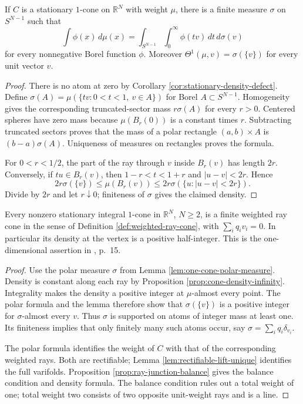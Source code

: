 \begin{lemma}\label{lem:one-cone-polar-measure}
If $C$ is a stationary $1$-cone on $\mathbb R^N$ with weight $\mu$, there is a finite measure $\sigma$ on $S^{N-1}$ such that
\[
 \int\phi(x)\,d\mu(x)=\int_{S^{N-1}}\int_0^\infty\phi(tv)\,dt\,d\sigma(v)
\]
for every nonnegative Borel function $\phi$. Moreover $\Theta^1(\mu,v)=\sigma(\{v\})$ for every unit vector $v$.
\end{lemma}
\begin{proof}
There is no atom at zero by Corollary \ref{cor:stationary-density-defect}. Define $\sigma(A)=\mu(\{tv:0<t<1,\ v\in A\})$ for Borel $A\subset S^{N-1}$. Homogeneity gives the corresponding truncated-sector mass $r\sigma(A)$ for every $r>0$. Centered spheres have zero mass because $\mu(B_r(0))$ is a constant times $r$. Subtracting truncated sectors proves that the mass of a polar rectangle $(a,b)\times A$ is $(b-a)\sigma(A)$. Uniqueness of measures on rectangles proves the formula.

For $0<r<1/2$, the part of the ray through $v$ inside $B_r(v)$ has length $2r$. Conversely, if $tu\in B_r(v)$, then $1-r<t<1+r$ and $|u-v|<2r$. Hence
\[
 2r\sigma(\{v\})\leq\mu(B_r(v))
 \leq2r\sigma(\{u:|u-v|<2r\}).
\]
Divide by $2r$ and let $r\downarrow0$; finiteness of $\sigma$ gives the claimed density.
\end{proof}

\begin{theorem}\label{thm:one-dimensional-cones}
Every nonzero stationary integral $1$-cone in $\mathbb R^N$, $N\geq2$, is a finite weighted ray cone in the sense of Definition \ref{def:weighted-ray-cone}, with $\sum_iq_iv_i=0$. In particular its density at the vertex is a positive half-integer. This is the one-dimensional assertion in \cite{Minter}, p.~15.
\end{theorem}
\begin{proof}
Use the polar measure $\sigma$ from Lemma \ref{lem:one-cone-polar-measure}. Density is constant along each ray by Proposition \ref{prop:cone-density-infinity}. Integrality makes the density a positive integer at $\mu$-almost every point. The polar formula and the lemma therefore show that $\sigma(\{v\})$ is a positive integer for $\sigma$-almost every $v$. Thus $\sigma$ is supported on atoms of integer mass at least one. Its finiteness implies that only finitely many such atoms occur, say $\sigma=\sum_iq_i\delta_{v_i}$.

The polar formula identifies the weight of $C$ with that of the corresponding weighted rays. Both are rectifiable; Lemma \ref{lem:rectifiable-lift-unique} identifies the full varifolds. Proposition \ref{prop:ray-junction-balance} gives the balance condition and density formula. The balance condition rules out a total weight of one; total weight two consists of two opposite unit-weight rays and is a line.
\end{proof}

